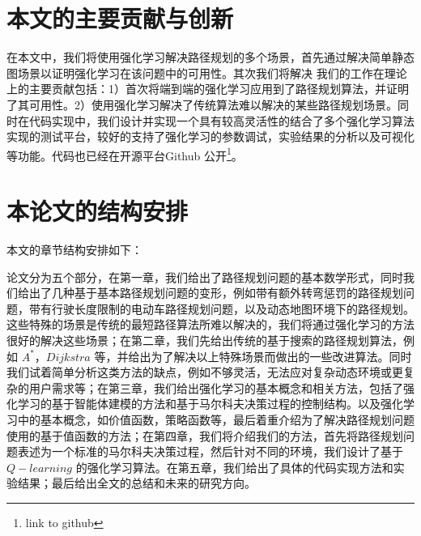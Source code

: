 \documentclass{standalone}
\begin{document}


\section{本文的主要贡献与创新} 
在本文中，我们将使用强化学习解决路径规划的多个场景，首先通过解决简单静态图场景以证明强化学习在该问题中的可用性。其次我们将解决
我们的工作在理论上的主要贡献包括：1）首次将端到端的强化学习应用到了路径规划算法，并证明了其可用性。2）使用强化学习解决了传统算法难以解决的某些路径规划场景。同时在代码实现中，我们设计并实现一个具有较高灵活性的结合了多个强化学习算法实现的测试平台，较好的支持了强化学习的参数调试，实验结果的分析以及可视化等功能。代码也已经在开源平台Github 公开\footnote{link to github}。

\section{本论文的结构安排}
本文的章节结构安排如下：\par
论文分为五个部分，在第一章，我们给出了路径规划问题的基本数学形式，同时我们给出了几种基于基本路径规划问题的变形，例如带有额外转弯惩罚的路径规划问题，带有行驶长度限制的电动车路径规划问题，以及动态地图环境下的路径规划。这些特殊的场景是传统的最短路径算法所难以解决的，我们将通过强化学习的方法很好的解决这些场景；在第二章，我们先给出传统的基于搜索的路径规划算法，例如 $A^{*}$，$Dijkstra$ 等，并给出为了解决以上特殊场景而做出的一些改进算法。同时我们试着简单分析这类方法的缺点，例如不够灵活，无法应对复杂动态环境或更复杂的用户需求等；在第三章，我们给出强化学习的基本概念和相关方法，包括了强化学习的基于智能体建模的方法和基于马尔科夫决策过程的控制结构。以及强化学习中的基本概念，如价值函数，策略函数等，最后着重介绍为了解决路径规划问题使用的基于值函数的方法；在第四章，我们将介绍我们的方法，首先将路径规划问题表述为一个标准的马尔科夫决策过程，然后针对不同的环境，我们设计了基于 $Q-learning$ 的强化学习算法。在第五章，我们给出了具体的代码实现方法和实验结果；最后给出全文的总结和未来的研究方向。
\end{document}
